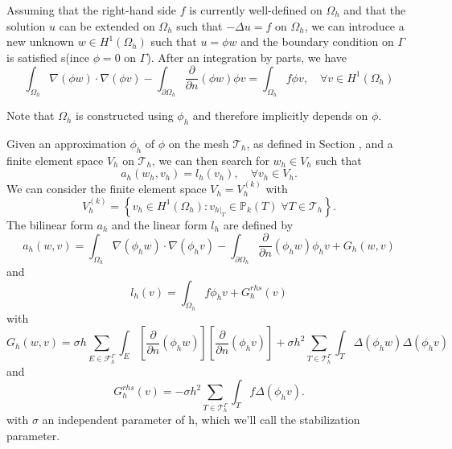 Assuming that the right-hand side $f$ is currently well-defined on $\Omega_h$ and that the solution $u$ can be extended on $\Omega_h$ such that $-\Delta u=f$ on $\Omega_h$, we can introduce a new unknown $w\in H^1(\Omega_h)$ such that $u=\phi w$ and the boundary condition on $\Gamma$ is satisfied s(ince $\phi=0$ on $\Gamma$). After an integration by parts, we have
\begin{equation*}
	\int_{\Omega_h}\nabla(\phi w)\cdot\nabla(\phi v)-\int_{\partial\Omega_h}\frac{\partial}{\partial n}(\phi w)\phi v=\int_{\Omega_h} f\phi v,\quad \forall v\in H^1(\Omega_h)
\end{equation*}
\begin{Rem}
	Note that $\Omega_h$ is constructed using $\phi_h$ and therefore implicitly depends on $\phi$.
\end{Rem}
Given an approximation $\phi_h$ of $\phi$ on the mesh $\mathcal{T}_h$, as defined in Section , and a finite element space $V_h$ on $\mathcal{T}_h$, we can then search for $w_h\in V_h$ such that
\begin{equation*}
	a_h(w_h,v_h)=l_h(v_h), \quad \forall v_h\in V_h.
\end{equation*}
We can consider the finite element space $V_h=V_h^{(k)}$ with
\begin{equation*}
	V_h^{(k)}=\left\{v_h\in H^1(\Omega_h):v_{h|_T}\in\mathbb{P}_k(T) \;  \forall T\in\mathcal{T}_h\right\}.
\end{equation*}
The bilinear form $a_h$ and the linear form $l_h$ are defined by
\begin{equation*}
	a_h(w,v)=\int_{\Omega_h} \nabla (\phi_h w) \cdot \nabla (\phi_h v) - \int_{\partial\Omega_h} \frac{\partial}{\partial n}(\phi_h w)\phi_h v+G_h(w,v)
\end{equation*}
and
\begin{equation*}
	l_h(v)=\int_{\Omega_h} f \phi_h v + G_h^{rhs}(v)
\end{equation*}
with
\begin{equation*}
G_h(w,v)=\sigma h\sum_{E\in\mathcal{F}_h^\Gamma} \int_E \left[\frac{\partial}{\partial n}(\phi_h w)\right] \left[\frac{\partial}{\partial n}(\phi_h v)\right]+\sigma h^2\sum_{T\in\mathcal{T}_h^\Gamma} \int_{T} \Delta(\phi_h w)\Delta(\phi_h v)
\end{equation*}
and
\begin{equation*}
G_h^{rhs}(v)=-\sigma h^2\sum_{T\in\mathcal{T}_h^\Gamma} \int_{T} f \Delta(\phi_h v).
\end{equation*}
with $\sigma$ an independent parameter of h, which we'll call the stabilization parameter.

